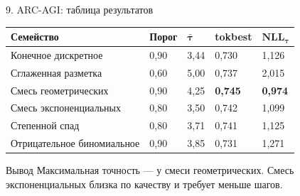 \documentclass[aspectratio=169,11pt]{beamer}
\begin{document}
\begin{frame}{9. ARC-AGI: таблица результатов}
\small
\renewcommand{\arraystretch}{1.18}
\begin{tabularx}{\textwidth}{@{}Y C{14mm} C{15mm} C{16mm} C{15mm}@{}}
\toprule
\textbf{Семейство} & \textbf{Порог} & $\boldsymbol{\bar\tau}$ & \textbf{tokbest} & $\boldsymbol{NLL_\tau}$ \\
\midrule
Конечное дискретное & 0,90 & 3,44 & 0,730 & 1,126 \\
Сглаженная разметка & 0,60 & 5,00 & 0,737 & 2,015 \\
Смесь геометрических & 0,90 & 4,25 & \textbf{0,745} & \textbf{0,974} \\
Смесь экспоненциальных & 0,80 & 3,50 & 0,742 & 1,099 \\
Степенной спад & 0,80 & 3,71 & 0,741 & 1,125 \\
Отрицательное биномиальное & 0,90 & 3,85 & 0,731 & 1,271 \\
\bottomrule
\end{tabularx}

\vspace{3mm}
\begin{block}{Вывод}
Максимальная точность — у смеси геометрических. Смесь экспоненциальных близка по качеству и требует меньше шагов.
\end{block}
\end{frame}
\end{document}

